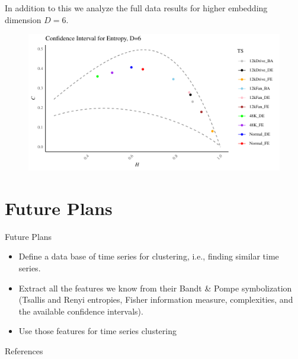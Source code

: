 \documentclass{beamer}
\begin{document}
\begin{frame}
	In addition to this we analyze the full data results for higher embedding dimension $D=6$.
		\begin{figure}[hbt]
		\centering
		\includegraphics[width=0.8 \textwidth]{Confidence Interval}
		\label{fig:EntopyComplexity Plane D=6}
	\end{figure}
\end{frame}


\section{Future Plans}

\begin{frame}{Future Plans}
    \begin{itemize}
        \item Define a data base of time series for clustering, i.e., finding similar time series.
        \item Extract all the features we know from their Bandt \& Pompe symbolization (Tsallis and Renyi entropies, Fisher information measure, complexities, and the available confidence intervals).
        \item Use those features for time series clustering
    \end{itemize}
\end{frame}

\begin{frame}[allowframebreaks]{References}
    
    
    
\end{frame}
\end{document}

